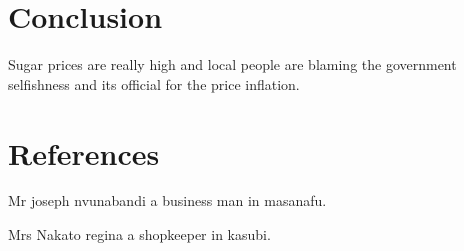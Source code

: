 \documentclass{article}
\begin{document}
\section{Conclusion}{
Sugar prices are really high and local people are blaming the government selfishness and its official for the price inflation.
}
\section{References}{
Mr joseph nvunabandi a business man in masanafu.\par
Mrs Nakato regina a shopkeeper in kasubi.

}
\end{document}
